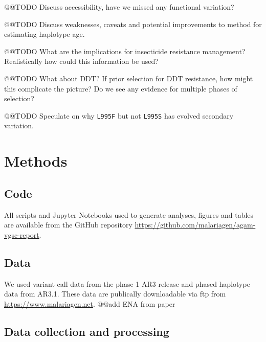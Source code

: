 \documentclass[a4paper,11pt,abstracton,hidelinks]{scrartcl}
\begin{document}
@@TODO Discuss accessibility, have we missed any functional variation?


@@TODO Discuss weaknesses, caveats and potential improvements to method for estimating haplotype age.


@@TODO What are the implications for insecticide resistance management? Realistically how could this information be used?


@@TODO What about DDT? If prior selection for DDT resistance, how might this complicate the picture? Do we see any evidence for multiple phases of selection?


@@TODO Speculate on why \texttt{L995F} but not \texttt{L995S} has evolved secondary variation.


\section*{Methods}

\subsection*{Code}

%
All scripts and Jupyter Notebooks used to generate analyses, figures and tables are available from the GitHub repository \url{https://github.com/malariagen/agam-vgsc-report}. 

\subsection*{Data}

%
We used variant call data from the phase 1 AR3 release and phased haplotype data from AR3.1. These data are publically downloadable via ftp from \url{https://www.malariagen.net}. 
%
@@add ENA from paper


\subsection*{Data collection and processing}
\end{document}
